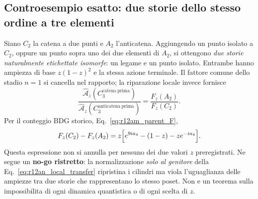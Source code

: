 \documentclass[11pt,a4paper]{article}
\begin{document}
\subsection{Controesempio esatto: due storie dello stesso ordine a tre elementi}
Siano $C_2$ la catena a due punti e $A_2$ l'anticatena. Aggiungendo un punto isolato a $C_2$, oppure un punto sopra uno dei due elementi di $A_2$, si ottengono \emph{due storie naturalmente etichettate isomorfe}: un legame e un punto isolato. Entrambe hanno ampiezza di base $z(1-z)^2$ e la stessa azione terminale. Il fattore comune dello stadio $n=1$ si cancella nel rapporto; la riparazione locale invece fornisce
\begin{equation}
 \frac{\widehat{\mathcal A}_z(C_3^{\mathrm{catena\ prima}})}
 {\widehat{\mathcal A}_z(C_3^{\mathrm{anticatena\ prima}})}
 =\frac{F_z(A_2)}{F_z(C_2)}.
 \label{eq:r12an_covariance_ratio}
\end{equation}
Per il conteggio BDG storico, Eq.~\eqref{eq:r12am_parent_F},
\begin{equation}
 F_z(C_2)-F_z(A_2)=z\Bigl[e^{9ia_4}-(1-z)-ze^{-ia_4}\Bigr].
 \label{eq:r12an_diamond_obstruction}
\end{equation}
Questa espressione non si annulla per nessuno dei due valori $z$ preregistrati. Ne segue un \textbf{no-go ristretto}: la normalizzazione \emph{solo al genitore} della Eq.~\eqref{eq:r12an_local_transfer} ripristina i cilindri ma viola l'uguaglianza delle ampiezze tra due storie che rappresentano lo stesso poset. Non e un teorema sulla impossibilita di ogni dinamica quantistica o di ogni scelta di $z$.
\end{document}
